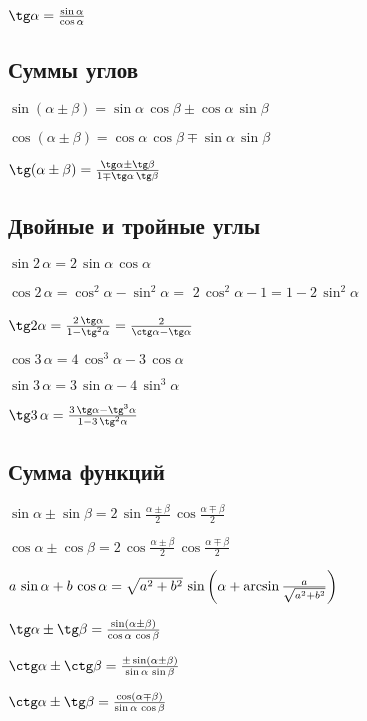 $ \tg \alpha = \frac{\sin \alpha}{\cos \alpha} $

\subsection{Суммы углов}

$ \sin(\alpha\pm \beta) = \sin \alpha\, \cos \beta \pm \cos \alpha\, \sin \beta $

$ \cos(\alpha\pm \beta) = \cos \alpha\, \cos \beta \mp \sin \alpha\, \sin \beta $

$ \tg (\alpha \pm \beta) = \frac{\tg \alpha \pm \tg \beta}{1 \mp \tg \alpha \, \tg \beta} $

\subsection{Двойные и тройные углы}

$ \sin 2\, \alpha = 2\, \sin \alpha\, \cos \alpha $

$ \cos 2\, \alpha = \cos^2 \alpha - \sin^2 \alpha = $ $ 2\, \cos^2 \alpha - 1 = 1 - 2\, \sin^2 \alpha $

$ \tg 2\alpha = \frac{2\, \tg \alpha}{1 - \tg^2 \alpha} = \frac{2}{\ctg \alpha - \tg \alpha} $

$ \cos 3\, \alpha = 4\, \cos^3 \alpha - 3\, \cos \alpha $

$ \sin 3\, \alpha = 3\, \sin \alpha - 4\, \sin^3 \alpha $

$ \tg 3\, \alpha = \frac{3\, \tg \alpha - \tg^3 \alpha}{1 - 3\, \tg^2 \alpha} $

\subsection{Сумма функций}

$ \sin \alpha \pm \sin \beta = 2\, \sin \frac{\alpha \pm \beta}{2}\, \cos \frac{\alpha \mp \beta}{2} $

$ \cos \alpha \pm \cos \beta = 2\, \cos \frac{\alpha \pm \beta}{2}\, \cos \frac{\alpha \mp \beta}{2} $

$ a\, \sin \alpha + b\, \cos \alpha = \sqrt{\mathstrut a^2 + b^2}\, \sin \left(\alpha + \arcsin \frac{a}{\sqrt{\mathstrut a^2 + b^2}}\right) $

$ \tg \alpha \pm \tg \beta = \frac{\sin (\alpha \pm \beta)}{\cos \alpha\, \cos \beta} $

$ \ctg \alpha \pm \ctg \beta = \frac{\pm\sin (\alpha \pm \beta)}{\sin \alpha\, \sin \beta} $

$ \ctg \alpha \pm \tg \beta = \frac{\cos (\alpha \mp \beta)}{\sin \alpha\, \cos \beta} $

